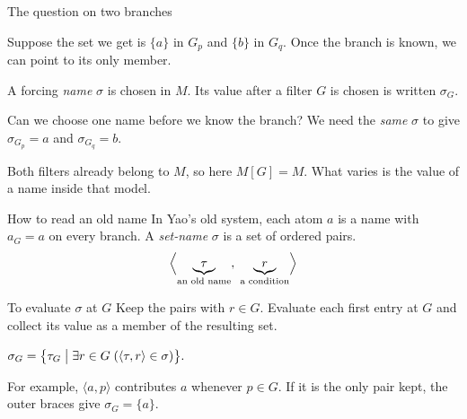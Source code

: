 \documentclass[aspectratio=169,11pt]{beamer}
\begin{document}
\begin{frame}[t]{The question on two branches}
\begin{ACcolumns}
\ACdiagramcolumn
\centering{}
\ACtextcolumn
Suppose the set we get is $\{a\}$ in $G_p$ and $\{b\}$ in $G_q$. Once the branch is known, we can point to its only member.
\medskip\par
A forcing \emph{name} $\sigma$ is chosen in $M$. Its value after a filter $G$ is chosen is written $\sigma_G$.
\end{ACcolumns}
\begin{block}{Can we choose one name before we know the branch?}
We need the \emph{same} $\sigma$ to give $\sigma_{G_p}=a$ and $\sigma_{G_q}=b$.
\end{block}
Both filters already belong to $M$, so here $M[G]=M$. What varies is the value of a name inside that model.
\end{frame}

\begin{frame}[t]{How to read an old name}
In Yao's old system, each atom $a$ is a name with $a_G=a$ on every branch. A \emph{set-name} $\sigma$ is a set of ordered pairs.
\[
\Bigl\langle\underbrace{\tau}_{\text{an old name}},\;
                \underbrace{r}_{\text{a condition}}\Bigr\rangle
\]
\begin{block}{To evaluate $\sigma$ at $G$}
Keep the pairs with $r\in G$. Evaluate each first entry at $G$ and collect its value as a member of the resulting set.
\par\smallskip
\centerline{$\displaystyle \sigma_G=\bigl\{\tau_G \bigm| \exists r\in G\;(\langle\tau,r\rangle\in\sigma)\bigr\}.$}
\end{block}
For example, $\langle a,p\rangle$ contributes $a$ whenever $p\in G$. If it is the only pair kept, the outer braces give $\sigma_G=\{a\}$.
\end{frame}
\end{document}
